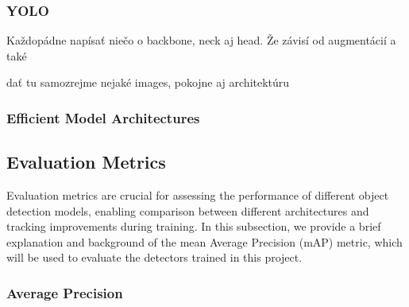 \subsubsection{YOLO}

Každopádne napísať niečo o backbone, neck aj head. Že závisí od augmentácií a také

dať tu samozrejme nejaké images, pokojne aj architektúru



\subsubsection{Efficient Model Architectures}





\subsection{Evaluation Metrics}
\label{EvaluationMetrics}

Evaluation metrics are crucial for assessing the performance of different object
detection models, enabling comparison between different architectures and
tracking improvements during training. In this subsection, we provide a brief
explanation and background of the mean Average Precision (mAP) metric, which
will be used to evaluate the detectors trained in this project.


\subsubsection{Average Precision}


